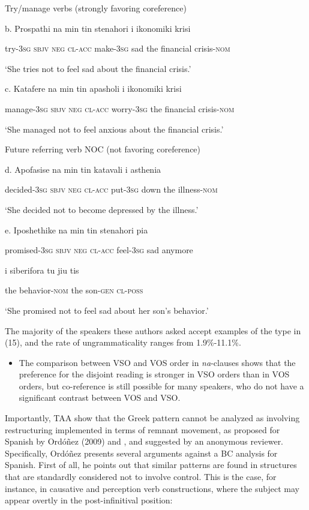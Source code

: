 \documentclass[output=paper]{langsci/langscibook}
\begin{document}
Try/manage verbs (strongly favoring coreference)

b.  Prospathi   na   min   tin   stenahori   i ikonomiki krisi 

try-\textsc{3sg sbjv}  \textsc{neg  cl-acc} make-\textsc{3sg} sad  the financial crisis-\textsc{nom}

‘She tries not to feel sad about the financial crisis.’

c.  Katafere   na   min   tin   apasholi    i ikonomiki krisi

manage-\textsc{3sg sbjv  neg  cl-acc} worry-\textsc{3sg} the financial crisis-\textsc{nom}

‘She managed not to feel anxious about the financial crisis.’

Future referring verb NOC (not favoring coreference)  

d.  Apofasise   na   min   tin   katavali   i asthenia 

    decided-\textsc{3sg} \textsc{sbjv}  \textsc{neg} \textsc{cl-acc}   put-\textsc{3sg} down the illness-\textsc{nom} 

    ‘She decided not to become depressed by the illness.’

e.   Iposhethike   na min   tin   stenahori   pia 

promised-\textsc{3sg} \textsc{sbjv}  \textsc{neg}   \textsc{cl-acc}  feel-\textsc{3sg} sad anymore 

i   siberifora    tu   jiu    tis

the   behavior-\textsc{nom}  the    son-\textsc{gen}   \textsc{cl-poss}

‘She promised not to feel sad about her son’s behavior.’

The majority of the speakers these authors asked accept examples of the type in (15), and the rate of ungrammaticality ranges from 1.9\%-11.1\%.  

\begin{itemize}
\item The comparison between VSO and VOS order in \textit{na}{}-clauses shows that the preference for the disjoint reading is stronger in VSO orders than in VOS orders, but co-reference is still possible for many speakers, who do not have a significant contrast between VOS and VSO. 
\end{itemize}

Importantly, TAA show that the Greek pattern cannot be analyzed as involving restructuring implemented in terms of remnant movement, as proposed for Spanish by Ordóñez (2009) and \citet{Herbeck2013}, and suggested by an anonymous reviewer. Specifically, Ordóñez presents several arguments against a BC analysis for Spanish. First of all, he points out that similar patterns are found in structures that are standardly considered not to involve control. This is the case, for instance, in causative and perception verb constructions, where the subject may appear overtly in the post-infinitival position:
\end{document}
